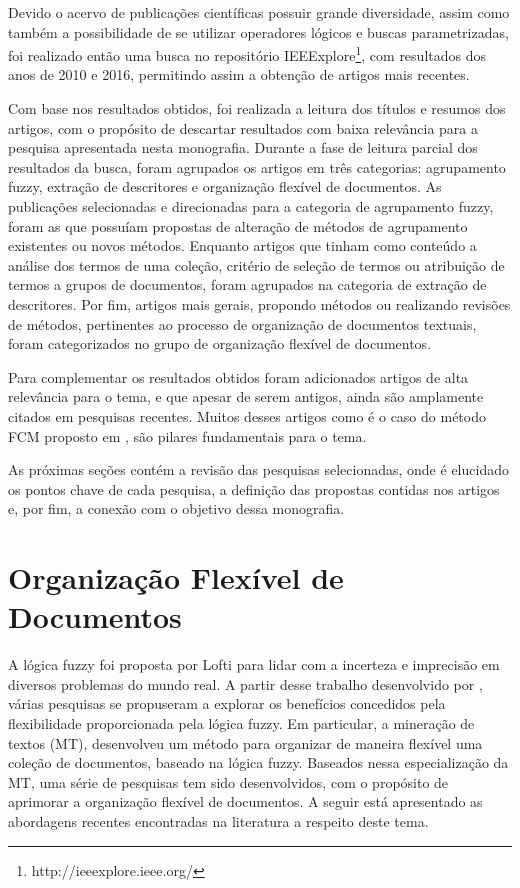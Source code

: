 Devido o acervo de publicações científicas possuir grande diversidade, assim como também a
possibilidade de se utilizar operadores lógicos e buscas parametrizadas, foi realizado então uma
busca no repositório IEEExplore\footnote{http://ieeexplore.ieee.org/}, com resultados dos anos de
2010 e 2016, permitindo assim a obtenção de artigos mais recentes.

Com base nos resultados obtidos, foi realizada a leitura dos títulos e resumos dos artigos, com o
propósito de descartar resultados com baixa relevância para a pesquisa apresentada nesta monografia.
Durante a fase de leitura parcial dos resultados da busca, foram agrupados os artigos em três
categorias: agrupamento fuzzy, extração de descritores e organização flexível de documentos.  As
publicações selecionadas e direcionadas para a categoria de agrupamento fuzzy, foram as que possuíam
propostas de alteração de métodos de agrupamento existentes ou novos métodos. Enquanto artigos que
tinham como conteúdo a análise dos termos de uma coleção, critério de seleção de termos ou
atribuição de termos a grupos de documentos, foram agrupados na categoria de extração de
descritores. Por fim, artigos mais gerais, propondo métodos ou realizando revisões de métodos,
pertinentes ao processo de organização de documentos textuais, foram categorizados no grupo de
organização flexível de documentos.

Para complementar os resultados obtidos foram adicionados artigos de alta relevância para o tema, e
que apesar de serem antigos, ainda são amplamente citados em pesquisas recentes. Muitos desses
artigos como é o caso do método FCM proposto em , são pilares fundamentais
para o tema.

As próximas seções contém a revisão das pesquisas selecionadas, onde é elucidado os pontos chave
de cada pesquisa, a definição das propostas contidas nos artigos e, por fim, a conexão com o objetivo
dessa monografia.

\section{Organização Flexível de Documentos}

A lógica fuzzy foi proposta por Lofti  para lidar com a incerteza e
imprecisão em diversos problemas do mundo real. A partir desse trabalho desenvolvido por
, várias pesquisas se propuseram a explorar os benefícios concedidos pela
flexibilidade proporcionada pela lógica fuzzy. Em particular, a mineração de textos (MT),
desenvolveu um método para organizar de maneira flexível uma coleção de documentos, baseado na
lógica fuzzy. Baseados nessa especialização da MT, uma série de pesquisas tem sido desenvolvidos,
com o propósito de aprimorar a organização flexível de documentos. A seguir está apresentado as
abordagens recentes encontradas na literatura a respeito deste tema.

